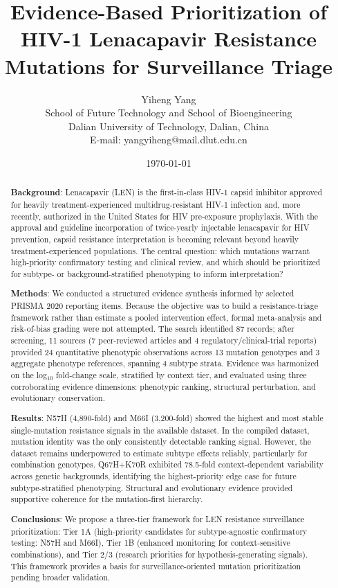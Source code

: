 \documentclass[12pt,a4paper]{article}
\title{Evidence-Based Prioritization of HIV-1 Lenacapavir Resistance Mutations for Surveillance Triage}
\author{Yiheng Yang\\
School of Future Technology and School of Bioengineering\\
Dalian University of Technology, Dalian, China\\
E-mail: yangyiheng@mail.dlut.edu.cn}
\date{\today}
\begin{document}
\maketitle

\begin{abstract}
\textbf{Background}: Lenacapavir (LEN) is the first-in-class HIV-1 capsid inhibitor approved for heavily treatment-experienced multidrug-resistant HIV-1 infection and, more recently, authorized in the United States for HIV pre-exposure prophylaxis. With the approval and guideline incorporation of twice-yearly injectable lenacapavir for HIV prevention, capsid resistance interpretation is becoming relevant beyond heavily treatment-experienced populations. The central question: which mutations warrant high-priority confirmatory testing and clinical review, and which should be prioritized for subtype- or background-stratified phenotyping to inform interpretation?

\textbf{Methods}: We conducted a structured evidence synthesis informed by selected PRISMA 2020 reporting items. Because the objective was to build a resistance-triage framework rather than estimate a pooled intervention effect, formal meta-analysis and risk-of-bias grading were not attempted. The search identified 87 records; after screening, 11 sources (7 peer-reviewed articles and 4 regulatory/clinical-trial reports) provided 24 quantitative phenotypic observations across 13 mutation genotypes and 3 aggregate phenotype references, spanning 4 subtype strata. Evidence was harmonized on the log$_{10}$ fold-change scale, stratified by context tier, and evaluated using three corroborating evidence dimensions: phenotypic ranking, structural perturbation, and evolutionary conservation.

\textbf{Results}: N57H (4,890-fold) and M66I (3,200-fold) showed the highest and most stable single-mutation resistance signals in the available dataset. In the compiled dataset, mutation identity was the only consistently detectable ranking signal. However, the dataset remains underpowered to estimate subtype effects reliably, particularly for combination genotypes. Q67H+K70R exhibited 78.5-fold context-dependent variability across genetic backgrounds, identifying the highest-priority edge case for future subtype-stratified phenotyping. Structural and evolutionary evidence provided supportive coherence for the mutation-first hierarchy.

\textbf{Conclusions}: We propose a three-tier framework for LEN resistance surveillance prioritization: Tier 1A (high-priority candidates for subtype-agnostic confirmatory testing: N57H and M66I), Tier 1B (enhanced monitoring for context-sensitive combinations), and Tier 2/3 (research priorities for hypothesis-generating signals). This framework provides a basis for surveillance-oriented mutation prioritization pending broader validation.
\end{abstract}
\end{document}
